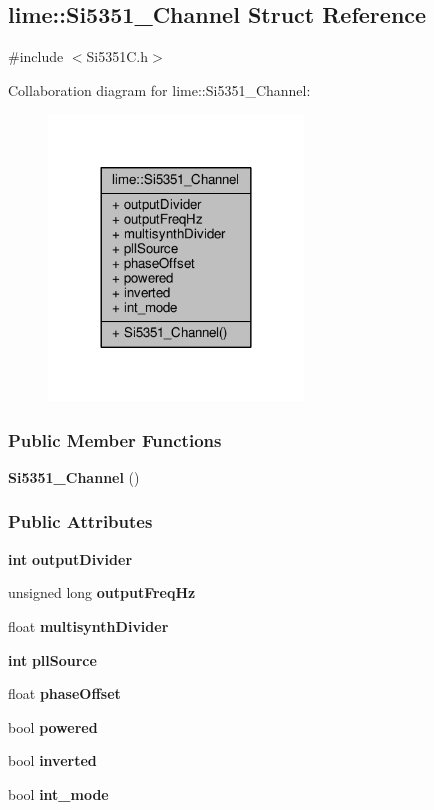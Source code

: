 \subsection{lime\+:\+:Si5351\+\_\+\+Channel Struct Reference}
\label{structlime_1_1Si5351__Channel}


{\ttfamily \#include $<$Si5351\+C.\+h$>$}



Collaboration diagram for lime\+:\+:Si5351\+\_\+\+Channel\+:
\nopagebreak
\begin{figure}[H]
\begin{center}
\leavevmode
\includegraphics[width=192pt]{d6/dd7/structlime_1_1Si5351__Channel__coll__graph}
\end{center}
\end{figure}
\subsubsection*{Public Member Functions}
\begin{DoxyCompactItemize}
\item 
{\bf Si5351\+\_\+\+Channel} ()
\end{DoxyCompactItemize}
\subsubsection*{Public Attributes}
\begin{DoxyCompactItemize}
\item 
{\bf int} {\bf output\+Divider}
\item 
unsigned long {\bf output\+Freq\+Hz}
\item 
float {\bf multisynth\+Divider}
\item 
{\bf int} {\bf pll\+Source}
\item 
float {\bf phase\+Offset}
\item 
bool {\bf powered}
\item 
bool {\bf inverted}
\item 
bool {\bf int\+\_\+mode}
\end{DoxyCompactItemize}


